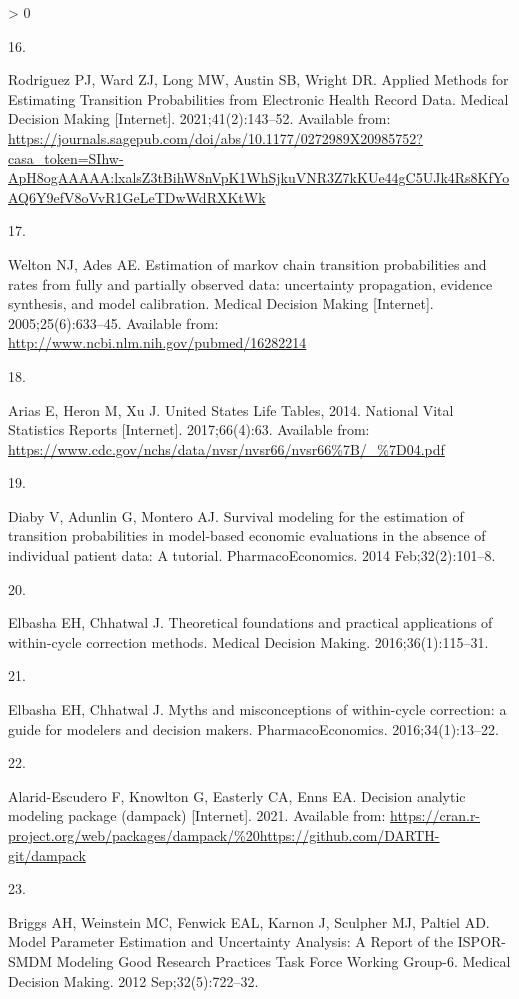 \documentclass[
]{article}
\newlength{\cslhangindent}
\newlength{\csllabelwidth}
\newenvironment{CSLReferences}[2] %
 {%
  \setlength{\parindent}{0pt}
  \ifodd #1 \everypar{\setlength{\hangindent}{\cslhangindent}}\ignorespaces\fi
  \ifnum #2 > 0
  \setlength{\parskip}{#2\baselineskip}
  \fi
 }%
 {}
\newcommand{\CSLLeftMargin}[1]{\parbox[t]{\csllabelwidth}{#1}}
\newcommand{\CSLRightInline}[1]{\parbox[t]{\linewidth - \csllabelwidth}{#1}\break}
\begin{document}
\begin{CSLReferences}{0}{0}
\leavevmode\hypertarget{ref-Rodriguez2021}{}%
\CSLLeftMargin{16. }
\CSLRightInline{Rodriguez PJ, Ward ZJ, Long MW, Austin SB, Wright DR. {Applied Methods for Estimating Transition Probabilities from Electronic Health Record Data}. Medical Decision Making {[}Internet{]}. 2021;41(2):143--52. Available from: \url{https://journals.sagepub.com/doi/abs/10.1177/0272989X20985752?casa_token=SIhw-ApH8ogAAAAA:lxalsZ3tBihW8nVpK1WhSjkuVNR3Z7kKUe44gC5UJk4Rs8KfYoAQ6Y9efV8oVvR1GeLeTDwWdRXKtWk}}

\leavevmode\hypertarget{ref-Welton2005}{}%
\CSLLeftMargin{17. }
\CSLRightInline{Welton NJ, Ades AE. {Estimation of markov chain transition probabilities and rates from fully and partially observed data: uncertainty propagation, evidence synthesis, and model calibration.} Medical Decision Making {[}Internet{]}. 2005;25(6):633--45. Available from: \url{http://www.ncbi.nlm.nih.gov/pubmed/16282214}}

\leavevmode\hypertarget{ref-Arias2017}{}%
\CSLLeftMargin{18. }
\CSLRightInline{Arias E, Heron M, Xu J. {United States Life Tables, 2014}. National Vital Statistics Reports {[}Internet{]}. 2017;66(4):63. Available from: \url{https://www.cdc.gov/nchs/data/nvsr/nvsr66/nvsr66\%7B/_\%7D04.pdf}}

\leavevmode\hypertarget{ref-Diaby2014}{}%
\CSLLeftMargin{19. }
\CSLRightInline{Diaby V, Adunlin G, Montero AJ. {Survival modeling for the estimation of transition probabilities in model-based economic evaluations in the absence of individual patient data: A tutorial}. PharmacoEconomics. 2014 Feb;32(2):101--8. }

\leavevmode\hypertarget{ref-Elbasha2016}{}%
\CSLLeftMargin{20. }
\CSLRightInline{Elbasha EH, Chhatwal J. {Theoretical foundations and practical applications of within-cycle correction methods}. Medical Decision Making. 2016;36(1):115--31. }

\leavevmode\hypertarget{ref-Elbasha2016a}{}%
\CSLLeftMargin{21. }
\CSLRightInline{Elbasha EH, Chhatwal J. {Myths and misconceptions of within-cycle correction: a guide for modelers and decision makers}. PharmacoEconomics. 2016;34(1):13--22. }

\leavevmode\hypertarget{ref-Alarid-Escudero2021}{}%
\CSLLeftMargin{22. }
\CSLRightInline{Alarid-Escudero F, Knowlton G, Easterly CA, Enns EA. Decision analytic modeling package (dampack) {[}Internet{]}. 2021. Available from: \url{https://cran.r-project.org/web/packages/dampack/\%20https://github.com/DARTH-git/dampack}}

\leavevmode\hypertarget{ref-Briggs2012}{}%
\CSLLeftMargin{23. }
\CSLRightInline{Briggs AH, Weinstein MC, Fenwick EAL, Karnon J, Sculpher MJ, Paltiel AD. {Model Parameter Estimation and Uncertainty Analysis: A Report of the ISPOR-SMDM Modeling Good Research Practices Task Force Working Group-6.} Medical Decision Making. 2012 Sep;32(5):722--32. }


\end{CSLReferences}
\end{document}
